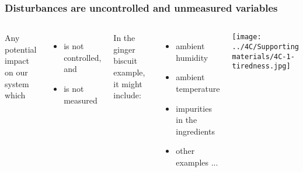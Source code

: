 \begin{frame}\frametitle{Disturbances are uncontrolled and unmeasured variables}
	
	\begin{columns}[T]
			Any potential impact on our system which
			\begin{itemize}
				\item	is not controlled, and
		
				\item	is not measured
			\end{itemize}
			
			\vspace{1cm}
			In the ginger biscuit example, it might include:
			\begin{itemize}
				\item	ambient humidity
				\item	ambient temperature
				\item	impurities in the ingredients
				\item	other examples ...
			\end{itemize}
		
			\texttt{[image: ../4C/Supporting materials/4C-1-tiredness.jpg]}
	\end{columns}
\end{frame}

